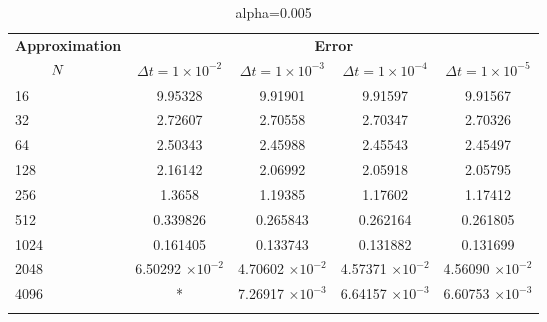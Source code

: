 \begin{table}
	\begin{tabular}{lcccc}
		\toprule
		\multicolumn{1}{c}{\textbf{Approximation}} & \multicolumn{4}{c}{\textbf{Error}} \\
		$\hspace{9mm}N$ & $\Delta t=1\times 10^{-2}$ & $\Delta t=1\times 10^{-3}$ & $\Delta t=1\times 10^{-4}$ & $\Delta t=1\times 10^{-5}$ \\
		\midrule
		\hspace{7mm} 16 & 9.95328   & 9.91901    & 9.91597    & 9.91567    \\
		\midrule
		\hspace{7mm} 32 & 2.72607   & 2.70558    & 2.70347    & 2.70326    \\
		\midrule
		\hspace{7mm} 64 & 2.50343   & 2.45988    & 2.45543    & 2.45497    \\
		\midrule
		\hspace{7mm} 128 & 2.16142   & 2.06992    & 2.05918    & 2.05795    \\
		\midrule
		\hspace{7mm} 256 & 1.3658    & 1.19385    & 1.17602    & 1.17412    \\
		\midrule
		\hspace{7mm} 512 & 0.339826  & 0.265843   & 0.262164   & 0.261805   \\
		\midrule
		\hspace{7mm} 1024 & 0.161405  & 0.133743   & 0.131882   & 0.131699   \\
		\midrule
		\hspace{7mm} 2048 & 6.50292 $\times 10^{-2}$ & 4.70602 $\times 10^{-2}$ & 4.57371 $\times 10^{-2}$  & 4.56090 $\times 10^{-2}$  \\
		\midrule
		\hspace{7mm} 4096 & * & 7.26917 $\times 10^{-3}$ & 6.64157 $\times 10^{-3}$ & 6.60753 $\times 10^{-3}$ \\
		\\
		\bottomrule
	\end{tabular}
	\caption{alpha=0.005}
\end{table}
